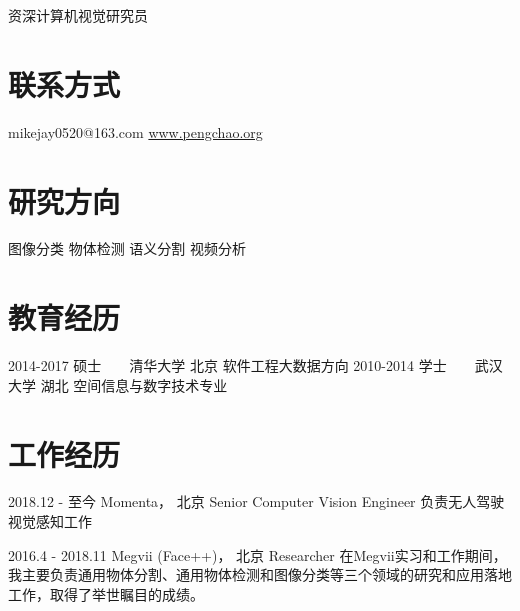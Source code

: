 \documentclass[]{friggeri-cv}
\begin{document}
       {资深计算机视觉研究员}

\begin{aside}
  \section{联系方式}
    mikejay0520@163.com
    \href{http://www.pengchao.org}{www.pengchao.org}
  \section{研究方向}
    图像分类
    物体检测
    语义分割
    视频分析
\end{aside}

\section{教育经历}
\begin{entrylist}
  \entry
    {2014-2017}
    {硕士~~~~清华大学}
    {北京}
    {软件工程大数据方向}
  \entry
    {2010-2014}
    {学士~~~~武汉大学}
    {湖北}
    {空间信息与数字技术专业}
\end{entrylist}


\section{工作经历}
\begin{entrylist}
  \entry
    {2018.12 - 至今}
    {Momenta， 北京}
    {Senior Computer Vision Engineer}
    {负责无人驾驶视觉感知工作}

  \entry
    {2016.4 - 2018.11 \qquad }
    {Megvii (Face++)， 北京}
    {Researcher}
    {在Megvii实习和工作期间，我主要负责通用物体分割、通用物体检测和图像分类等三个领域的研究和应用落地工作，取得了举世瞩目的成绩。}

\end{entrylist}
\end{document}
